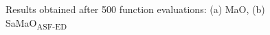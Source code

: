 \documentclass[onecolumn,10pt]{asme2ej}
\begin{document}
\begin{figure}[!htb]
	\centering    
	\caption{Results obtained after 500 function evaluations: (a) MaO, (b) SaMaO\textsubscript{ASF-ED}}
	\label{fig:500}
\end{figure}
 
\end{document}
